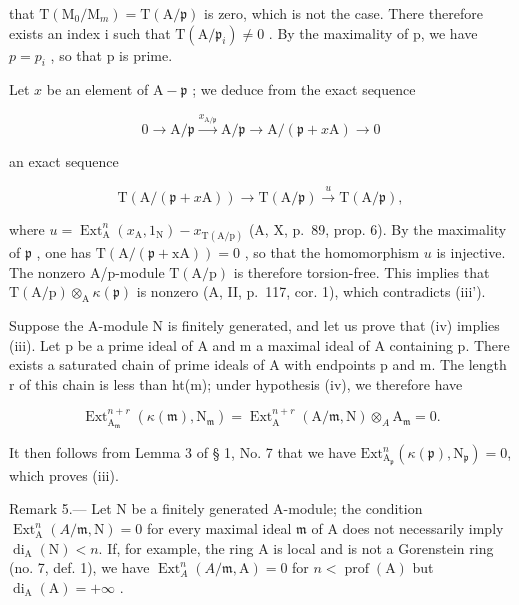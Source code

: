 that \(\mathrm{T}(\mathrm{M}_{0}/\mathrm{M}_{m})=\mathrm{T}(\mathrm{A}/\mathfrak{p})\) is zero, which is not the case. There therefore exists an index i such that \(\mathrm{T}(\mathrm{A}/\mathfrak{p}_{i})\neq0\) . By the maximality of p, we have \(p=p_{i}\) , so that p is prime.

Let \(x\) be an element of \(\mathrm{A} - \mathfrak{p}\) ; we deduce from the exact sequence

\[
0 \rightarrow \mathrm{A} / \mathfrak {p} \stackrel {{x _ {\mathrm{A} / \mathfrak {p}}}} {{\longrightarrow}} \mathrm{A} / \mathfrak {p} \longrightarrow \mathrm{A} / (\mathfrak {p} + x \mathrm{A}) \rightarrow 0
\]

an exact sequence

\[
\mathrm{T} (\mathrm{A} / (\mathfrak {p} + x \mathrm{A})) \longrightarrow \mathrm{T} (\mathrm{A} / \mathfrak {p}) \stackrel {{u}} {{\longrightarrow}} \mathrm{T} (\mathrm{A} / \mathfrak {p}),
\]

where \(u = \operatorname{Ext}_{\mathrm{A}}^{n}(x_{\mathrm{A}}, 1_{\mathrm{N}}) - x_{\mathrm{T(A/p)}}\) (A, X, p.~89, prop. 6). By the maximality of \(\mathfrak{p}\) , one has \(\mathrm{T(A / (\mathfrak{p} + xA))} = 0\) , so that the homomorphism \(u\) is injective. The nonzero A/p-module \(\mathrm{T(A/p)}\) is therefore torsion-free. This implies that \(\mathrm{T(A/p)} \otimes_{\mathrm{A}} \kappa(\mathfrak{p})\) is nonzero (A, II, p.~117, cor. 1), which contradicts (iii').

Suppose the A-module N is finitely generated, and let us prove that (iv) implies (iii). Let p be a prime ideal of A and m a maximal ideal of A containing p. There exists a saturated chain of prime ideals of A with endpoints p and m. The length r of this chain is less than ht(m); under hypothesis (iv), we therefore have

\[
\operatorname{Ext} _ {\mathrm{A} _ {\mathfrak {m}}} ^ {n + r} (\kappa (\mathfrak {m}), \mathrm{N} _ {\mathfrak {m}}) = \operatorname{Ext} _ {\mathrm{A}} ^ {n + r} (\mathrm{A} / \mathfrak {m}, \mathrm{N}) \otimes_ {A} \mathrm{A} _ {\mathfrak {m}} = 0.
\]

It then follows from Lemma 3 of § 1, No. 7 that we have \(\mathrm{Ext}_{\mathrm{A}_{\mathfrak{p}}}^{n}(\kappa(\mathfrak{p}),\mathrm{N}_{\mathfrak{p}})=0\), which proves (iii).

Remark 5.— Let N be a finitely generated A-module; the condition \(\operatorname{Ext}_{\mathrm{A}}^{n}(A/\mathfrak{m},\mathrm{N})=0\) for every maximal ideal \(\mathfrak{m}\) of A does not necessarily imply \(\operatorname{di}_{\mathrm{A}}(\mathrm{N})<n\). If, for example, the ring A is local and is not a Gorenstein ring (no. 7, def. 1), we have \(\operatorname{Ext}_{A}^{n}(A/\mathfrak{m},\mathrm{A})=0\) for \(n<\operatorname{prof}(\mathrm{A})\) but \(\operatorname{di}_{\mathrm{A}}(\mathrm{A})=+\infty\) .

